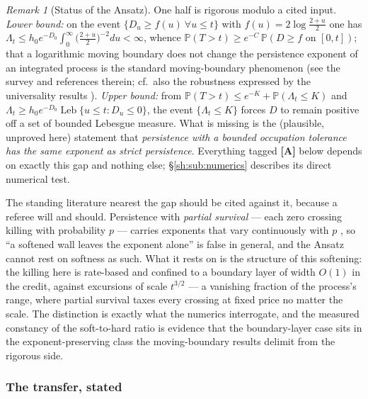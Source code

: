 \documentclass[11pt]{article}
\numberwithin{equation}{section}
\theoremstyle{plain}
\theoremstyle{definition}
\theoremstyle{remark}
\newtheorem{remark}[theorem]{Remark}
\newcommand{\PP}{\mathbb{P}}
\DeclareMathOperator{\Leb}{Leb}
\begin{document}
\begin{remark}[Status of the Ansatz]\label{sh:rem:ansatzstatus}
One half is rigorous modulo a cited input. \emph{Lower bound:} on the event
$\{D_u\ge f(u)\ \forall u\le t\}$ with $f(u)=2\log\frac{2+u}{2}$ one has
$\Lambda_t\le h_0e^{-D_0}\int_0^\infty\bigl(\tfrac{2+u}{2}\bigr)^{-2}du<\infty$,
whence $\PP(T>t)\ge e^{-C}\,\PP(D\ge f\text{ on }[0,t])$; that a logarithmic
moving boundary does not change the persistence exponent of an integrated
process is the standard moving-boundary phenomenon (see the survey
\cite{AS15} and references therein; cf.\ also the robustness expressed
by the universality results \cite{AD13,DW15}). \emph{Upper bound:} from
$\PP(T>t)\le e^{-K}+\PP(\Lambda_t\le K)$ and
$\Lambda_t\ge h_0e^{-D_0}\Leb\{u\le t:D_u\le0\}$, the event
$\{\Lambda_t\le K\}$ forces $D$ to remain positive off a set of bounded
Lebesgue measure. What is missing is the (plausible, unproved here)
statement that \emph{persistence with a bounded occupation tolerance has the
same exponent as strict persistence}. Everything tagged \textbf{[A]} below
depends on exactly this gap and nothing else; \S\ref{sh:sub:numerics}
describes its direct numerical test.

The standing literature nearest the gap should be cited against it,
because a referee will and should. Persistence with \emph{partial
survival} --- each zero crossing killing with probability $p$ ---
carries exponents that vary continuously with $p$
\cite{MB98, Bur14}, so ``a softened wall leaves the exponent alone''
is false in general, and the Ansatz cannot rest on softness as such.
What it rests on is the structure of this softening: the killing here
is rate-based and confined to a boundary layer of width $O(1)$ in the
credit, against excursions of scale $t^{3/2}$ --- a vanishing fraction
of the process's range, where partial survival taxes every crossing
at fixed price no matter the scale. The distinction is exactly what
the numerics interrogate, and the measured constancy of the
soft-to-hard ratio is evidence that the boundary-layer case sits in
the exponent-preserving class the moving-boundary results
\cite{AS15, DW15} delimit from the rigorous side.
\end{remark}

\subsubsection{The transfer, stated}\label{tc:subsub:transferstated}
\end{document}
